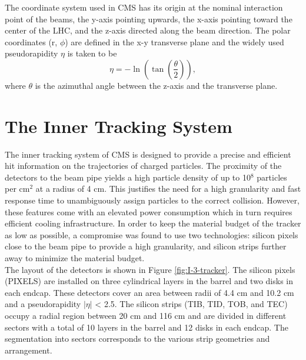     The coordinate system used in CMS has its origin at the nominal interaction point of the beams, the y-axis pointing upwards, the x-axis pointing toward the center of the LHC, and the z-axis directed along the beam direction. The polar coordinates (r, $ \phi $) are defined in the x-y transverse plane and the widely used pseudorapidity $ \eta $ is taken to be
    \begin{equation}
      \eta = - \ln\left( \tan\left( \frac{\theta}{2} \right) \right) ,
    \end{equation}
    where $ \theta $ is the azimuthal angle between the z-axis and the transverse plane.

  \section{The Inner Tracking System}

    The inner tracking system of CMS is designed to provide a precise and efficient hit information on the trajectories of charged particles.  The proximity of the detectors to the beam pipe yields a high particle density of up to 10$^8$ particles per cm$^2$ at a radius of 4 cm. This justifies the need for a high granularity and fast response time to unambiguously assign particles to the correct collision. However, these features come with an elevated power consumption which in turn requires efficient cooling infrastructure. In order to keep the material budget of the tracker as low as possible, a compromise was found to use two technologies: silicon pixels close to the beam pipe to provide a high granularity, and silicon strips further away to minimize the material budget. \\

    The layout of the detectors is shown in Figure \ref{fig:I-3-tracker}. The silicon pixels (PIXELS) are installed on three cylindrical layers in the barrel and two disks in each endcap. These detectors cover an area between radii of 4.4 cm and 10.2 cm and a pseudorapidity $|\eta|$ < 2.5. The silicon strips (TIB, TID, TOB, and TEC) occupy a radial region between 20 cm and 116 cm and are divided in different sectors with a total of 10 layers in the barrel and 12 disks in each endcap. The segmentation into sectors corresponds to the various strip geometries and arrangement. \\

